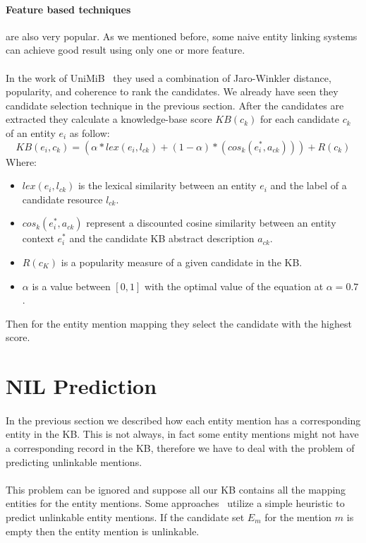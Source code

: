 \paragraph{Feature based techniques} are also very popular. As we mentioned before, some naive entity linking systems can achieve good result using only one or more feature.
\paragraph{} In the work of UniMiB~\cite{caliano2016unimib} they used a combination of Jaro-Winkler distance, popularity, and  coherence to rank the candidates. We already have seen they candidate selection technique in the previous section. After the candidates are extracted they calculate a knowledge-base score $KB(c_k)$ for each candidate $c_k$ of an entity $e_i$ as follow: \[KB(e_i, c_k) = (\alpha * lex(e_i, l_{ck}) + (1 - \alpha) * (cos_k(e^{*}_{i}, a_{ck}))) + R(c_k)\]
Where:

\begin{itemize}[noitemsep,  topsep=10pt]
\item $lex(e_i, l_{ck})$ is the lexical similarity between an entity $e_i$ and the label of a candidate resource $l_{ck}$.
\item $cos_k(e^{*}_{i}, a_{ck})$ represent a discounted cosine similarity between an entity context $e^{*}_{i}$ and the candidate KB abstract description $a_{ck}$.
\item $R(c_K)$ is a popularity measure of a given candidate in the KB.
\item $\alpha$ is a value between $[0, 1]$ with the optimal value of the equation at $\alpha = 0.7$.
\end{itemize}

Then for the entity mention mapping they select the candidate with the highest score.

\section{NIL Prediction}
\paragraph{}
In the previous section we described how each entity mention has a corresponding entity in the KB. This is not always, in fact some entity mentions might not have a corresponding record in the KB, therefore we have to deal with the problem of predicting unlinkable mentions.
\paragraph{}
This problem can be ignored and suppose all our KB contains all the mapping entities for the entity mentions. Some approaches~\cite{todo} utilize a simple heuristic to predict unlinkable entity mentions. If the candidate set $E_m$ for the mention $m$ is empty then the entity mention is unlinkable.
